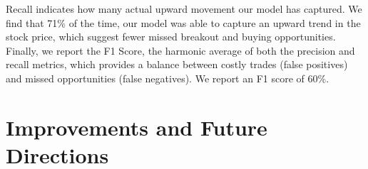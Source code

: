 \documentclass[12pt]{article}
\begin{document}
Recall indicates how many actual upward movement our model has captured. We find that 71\% of the time, our model was able to capture an upward trend in the stock price, which suggest fewer missed breakout and buying opportunities. Finally, we report the F1 Score, the harmonic average of both the precision and recall metrics, which provides a balance between costly trades (false positives) and missed opportunities (false negatives). We report an F1 score of 60\%.

\section*{Improvements and Future Directions}
\end{document}

